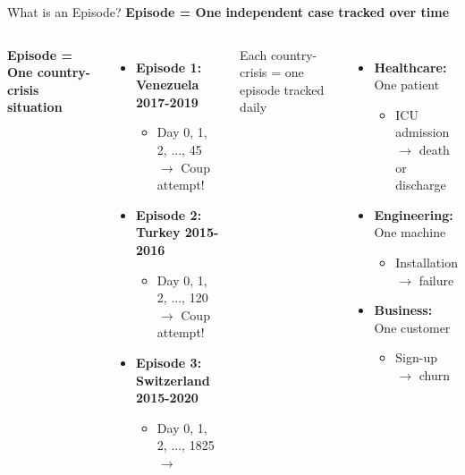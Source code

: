 \documentclass[aspectratio=169]{beamer}
\begin{document}
\begin{frame}{What is an Episode?}
\textbf{Episode = One independent case tracked over time}

\vspace{0.5em}
\begin{columns}[T]

\textbf{Episode = One country-crisis situation}
\begin{itemize}
\item \textbf{Episode 1: Venezuela 2017-2019}
  \begin{itemize}
  \item Day 0, 1, 2, ..., 45 $\to$ \alert{Coup attempt!}
  \end{itemize}
\item \textbf{Episode 2: Turkey 2015-2016}
  \begin{itemize}
  \item Day 0, 1, 2, ..., 120 $\to$ \alert{Coup attempt!}
  \end{itemize}
\item \textbf{Episode 3: Switzerland 2015-2020}
  \begin{itemize}
  \item Day 0, 1, 2, ..., 1825 $\to$ 
  \end{itemize}
\end{itemize}

\vspace{0.3em}
\small Each country-crisis = one episode tracked daily

\begin{itemize}
\item \textbf{Healthcare:} One patient
  \begin{itemize}
  \item ICU admission $\to$ death or discharge
  \end{itemize}
\item \textbf{Engineering:} One machine
  \begin{itemize}
  \item Installation $\to$ failure
  \end{itemize}
\item \textbf{Business:} One customer
  \begin{itemize}
  \item Sign-up $\to$ churn
  \end{itemize}
\end{itemize}
\end{columns}

\vspace{0.5em}
\begin{center}
\end{center}
\end{frame}
\end{document}

